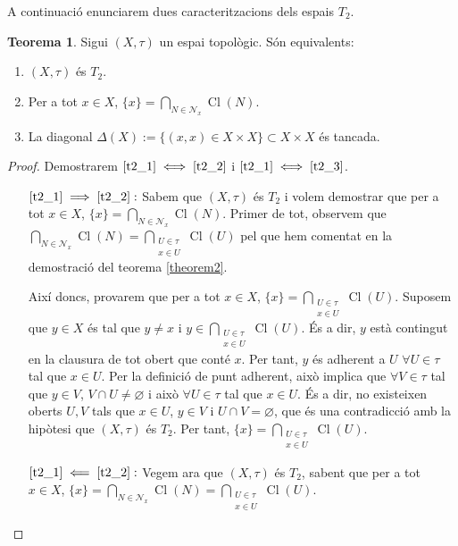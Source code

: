\documentclass[10pt,a4paper]{article}
\theoremstyle{definition}
\newtheorem{theorem}{Teorema}[section]
\DeclareMathOperator{\Cl}{Cl} %
\begin{document}
A continuació enunciarem dues caracteritzacions dels espais $T_2$.
\begin{theorem}
      Sigui $(X,\tau)$ un espai topològic. Són equivalents:
      \begin{enumerate}
            \item\label{t2_1} $(X,\tau)$ és $T_2$.
            \item\label{t2_2} Per a tot $x\in X$, $\{x\}=\bigcap_{N\in \mathcal{N}_x}\Cl(N)$.
            \item\label{t2_3} La diagonal $\Delta(X):=\{(x,x)\in X\times X\}\subset X\times X$ és tancada.
      \end{enumerate}
\end{theorem}
\begin{proof}
      Demostrarem $\ref{t2_1}\iff\ref{t2_2}$ i $\ref{t2_1}\iff\ref{t2_3}$.
      \begin{itemize}[leftmargin=2cm]
            \item [$\ref{t2_1}\implies\ref{t2_2}:$] Sabem que $(X,\tau)$ és $T_2$ i volem demostrar que per a tot $x\in X$, $\{x\}=\bigcap_{N\in \mathcal{N}_x}\Cl(N)$. Primer de tot, observem que $\bigcap_{N\in \mathcal{N}_x}\Cl(N)=\bigcap_{\substack{U\in \tau\\x\in U}}\Cl(U)$ pel que hem comentat en la demostració del teorema \ref{theorem2}.

                  Així doncs, provarem que per a tot $x\in X$, $\{x\}=\bigcap_{\substack{U\in \tau\\x\in U}}\Cl(U)$. Suposem que $y\in X$ és tal que $y\ne x$ i $y\in\bigcap_{\substack{U\in \tau\\x\in U}}\Cl(U)$. És a dir, $y$ està contingut en la clausura de tot obert que conté $x$. Per tant, $y$ és adherent a $U$ $\forall U\in\tau$ tal que $x\in U$. Per la definició de punt adherent, això implica que $\forall V\in\tau$ tal que $y\in V$, $V\cap U\ne\varnothing$ i això $\forall U\in\tau$ tal que $x\in U$. És a dir, no existeixen oberts $U,V$ tals que $x\in U$, $y\in V$ i $U\cap V=\varnothing$, que és una contradicció amb la hipòtesi que $(X,\tau)$ és $T_2$. Per tant, $\{x\}=\bigcap_{\substack{U\in \tau\\x\in U}}\Cl(U)$.
            \item [$\ref{t2_1}\impliedby\ref{t2_2}:$] Vegem ara que $(X,\tau)$ és $T_2$, sabent que per a tot $x\in X$, $\{x\}=\bigcap_{N\in \mathcal{N}_x}\Cl(N)=\bigcap_{\substack{U\in \tau\\x\in U}}\Cl(U)$.


\end{itemize}
\end{proof}
\end{document}
